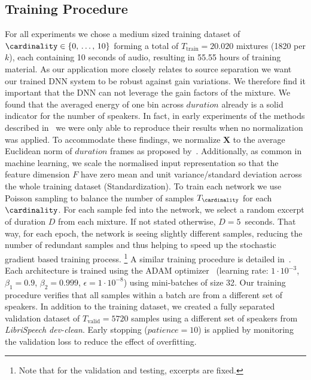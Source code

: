 \subsection*{Training Procedure}%
\label{ssec:parameters}
For all experiments we chose a medium sized training dataset of \(\cardinality \in \textrm{\{0, \ldots, 10\}}\) forming a total of \(T_{\textrm{train}} = 20.020\) mixtures  (1820 per \(k\)), each containing 10 seconds of audio, resulting in 55.55 hours of training material.
As our application more closely relates to source separation we want our trained DNN system to be robust against gain variations.
We therefore find it important that the DNN can not leverage the gain factors of the mixture.
We found that the averaged energy of one bin across \(duration\) already is a solid indicator for the number of speakers.
In fact, in early experiments of the methods described in~\cite{sayoud10, andrei15} we were only able to reproduce their results when no normalization was applied.
To accommodate these findings, we normalize \(\mathbf{X}\) to the average Euclidean norm of \(duration\) frames as proposed by~\cite{uhlich15}.
Additionally, as common in machine learning, we scale the normalised input representation so that the feature dimension \(F\) have zero mean and unit variance/standard deviation across the whole training dataset (Standardization).
To train each network we use Poisson sampling to balance the number of samples \(T_{ \cardinality}\) for each \(\cardinality \).
For each sample fed into the network, we select a random excerpt of duration \(D\) from each mixture. If not stated otherwise, \(D=5\)~seconds.
That way, for each epoch, the network is seeing slightly different samples, reducing the number of redundant samples and thus helping to speed up the stochastic gradient based training process.
\footnote{Note that for the validation and testing, excerpts are fixed.}
A similar training procedure is detailed in~\cite{schluter16}.
Each architecture is trained using the ADAM optimizer~\cite{kingma14} (learning rate: \(1 \cdot 10^{-3}\), \(\beta_1=0.9\), \(\beta_2=0.999\), \(\epsilon=1 \cdot 10^{-8}\)) using mini-batches of size 32.
Our training procedure verifies that all samples within a batch are from a different set of speakers.
In addition to the training dataset, we created a fully separated validation dataset of \(T_{\textrm{valid}} = 5720\) samples using a different set of speakers from \emph{LibriSpeech dev-clean}.
Early stopping (\(patience = 10\)) is applied by monitoring the validation loss to reduce the effect of overfitting.
